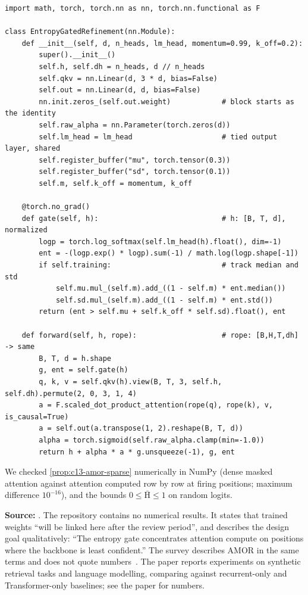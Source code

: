 \begin{lstlisting}[caption={Reference implementation (ours): entropy-gated attention refinement},label={lst:c13-amor-ref}]
import math, torch, torch.nn as nn, torch.nn.functional as F

class EntropyGatedRefinement(nn.Module):
    def __init__(self, d, n_heads, lm_head, momentum=0.99, k_off=0.2):
        super().__init__()
        self.h, self.dh = n_heads, d // n_heads
        self.qkv = nn.Linear(d, 3 * d, bias=False)
        self.out = nn.Linear(d, d, bias=False)
        nn.init.zeros_(self.out.weight)            # block starts as the identity
        self.raw_alpha = nn.Parameter(torch.zeros(d))
        self.lm_head = lm_head                     # tied output layer, shared
        self.register_buffer("mu", torch.tensor(0.3))
        self.register_buffer("sd", torch.tensor(0.1))
        self.m, self.k_off = momentum, k_off

    @torch.no_grad()
    def gate(self, h):                             # h: [B, T, d], normalized
        logp = torch.log_softmax(self.lm_head(h).float(), dim=-1)
        ent = -(logp.exp() * logp).sum(-1) / math.log(logp.shape[-1])
        if self.training:                          # track median and std
            self.mu.mul_(self.m).add_((1 - self.m) * ent.median())
            self.sd.mul_(self.m).add_((1 - self.m) * ent.std())
        return (ent > self.mu + self.k_off * self.sd).float(), ent

    def forward(self, h, rope):                    # rope: [B,H,T,dh] -> same
        B, T, d = h.shape
        g, ent = self.gate(h)
        q, k, v = self.qkv(h).view(B, T, 3, self.h, self.dh).permute(2, 0, 3, 1, 4)
        a = F.scaled_dot_product_attention(rope(q), rope(k), v, is_causal=True)
        a = self.out(a.transpose(1, 2).reshape(B, T, d))
        alpha = torch.sigmoid(self.raw_alpha.clamp(min=-1.0))
        return h + alpha * a * g.unsqueeze(-1), g, ent
\end{lstlisting}

We checked \cref{prop:c13-amor-sparse} numerically in NumPy (dense masked attention against attention
computed row by row at firing positions; maximum difference $10^{-16}$), and the bounds
$0\le\bar{\mathrm{H}}\le 1$ on random logits.

\begin{results}
\textbf{Source:} . The repository contains no
numerical results. It states that trained weights ``will be linked here after the review period'', and
describes the design goal qualitatively: ``The entropy gate concentrates attention compute on positions
where the backbone is least confident.'' The survey describes AMOR in the same terms and does not quote
numbers~\citep{zhoubian2026memory}. The paper reports experiments on synthetic retrieval tasks and
language modelling, comparing against recurrent-only and Transformer-only baselines; see the paper for
numbers.
\end{results}

